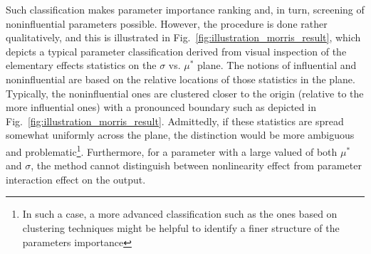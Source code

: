 Such classification makes parameter importance ranking and, in turn, screening of noninfluential parameters possible.
However, the procedure is done rather qualitatively, and this is illustrated in Fig.~\ref{fig:illustration_morris_result}, 
which depicts a typical parameter classification derived from visual inspection of the elementary effects statistics on the $\sigma$ vs. $\mu^*$ plane.
The notions of influential and noninfluential are based on the relative locations of those statistics in the plane.
Typically, the noninfluential ones are clustered closer to the origin (relative to the more influential ones) with a pronounced boundary such as depicted in Fig.~\ref{fig:illustration_morris_result}. 
Admittedly, if these statistics are spread somewhat uniformly across the plane, 
the distinction would be more ambiguous and problematic\footnote{In such a case, a more advanced classification such as the ones based on clustering techniques might be helpful to identify a finer structure of the parameters importance}.
Furthermore, for a parameter with a large valued of both $\mu^*$ and $\sigma$,
the method cannot distinguish between nonlinearity effect from parameter interaction effect on the output.

